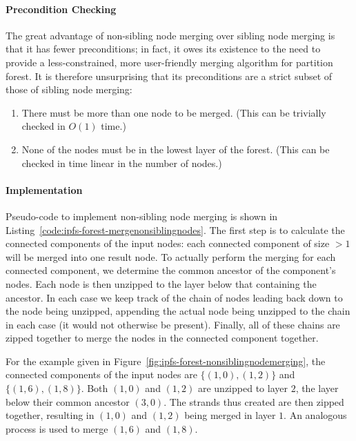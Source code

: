 \paragraph{Precondition Checking}

The great advantage of non-sibling node merging over sibling node merging is that it has fewer preconditions; in fact, it owes its existence to the need to provide a less-constrained, more user-friendly merging algorithm for partition forest. It is therefore unsurprising that its preconditions are a strict subset of those of sibling node merging:

\begin{enumerate}

\item There must be more than one node to be merged. (This can be trivially checked in $O(1)$ time.)
\item None of the nodes must be in the lowest layer of the forest. (This can be checked in time linear in the number of nodes.)

\end{enumerate}

\paragraph{Implementation}

Pseudo-code to implement non-sibling node merging is shown in Listing~\ref{code:ipfs-forest-mergenonsiblingnodes}. The first step is to calculate the connected components of the input nodes: each connected component of size $> 1$ will be merged into one result node. To actually perform the merging for each connected component, we determine the common ancestor of the component's nodes. Each node is then unzipped to the layer below that containing the ancestor. In each case we keep track of the chain of nodes leading back down to the node being unzipped, appending the actual node being unzipped to the chain in each case (it would not otherwise be present). Finally, all of these chains are zipped together to merge the nodes in the connected component together.

For the example given in Figure~\ref{fig:ipfs-forest-nonsiblingnodemerging}, the connected components of the input nodes are $\{(1,0), (1,2)\}$ and $\{(1,6), (1,8)\}$. Both $(1,0)$ and $(1,2)$ are unzipped to layer $2$, the layer below their common ancestor $(3,0)$. The strands thus created are then zipped together, resulting in $(1,0)$ and $(1,2)$ being merged in layer $1$. An analogous process is used to merge $(1,6)$ and $(1,8)$.

